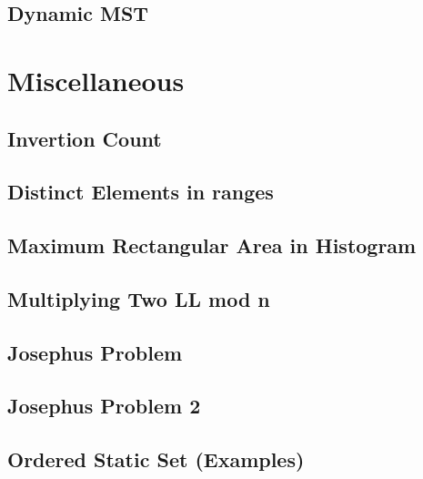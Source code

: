 \subsection{Dynamic MST}
\raggedbottom
\hrulefill

\section{Miscellaneous}
\subsection{Invertion Count}
\raggedbottom
\hrulefill
\subsection{Distinct Elements in ranges}
\raggedbottom
\hrulefill
\subsection{Maximum Rectangular Area in Histogram}
\raggedbottom
\hrulefill
\subsection{Multiplying Two LL mod n}
\raggedbottom
\hrulefill
\subsection{Josephus Problem}
\raggedbottom
\hrulefill
\subsection{Josephus Problem 2}
\raggedbottom
\hrulefill
\subsection{Ordered Static Set (Examples)}
\raggedbottom
\hrulefill

